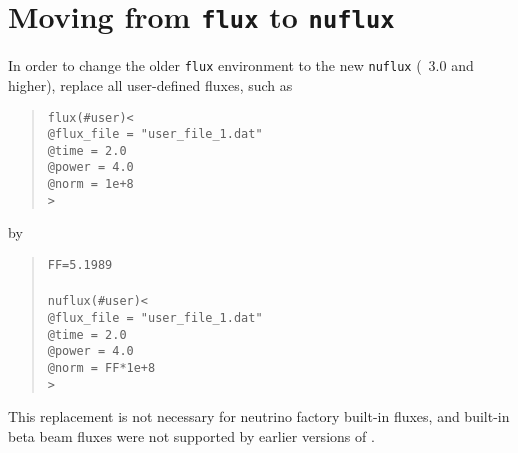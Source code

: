 \section*{Moving from {\tt flux} to {\tt nuflux}}

In order to change the older {\tt flux} environment to the
new {\tt nuflux} (\GLOBES\ 3.0 and higher), replace all user-defined fluxes, such as
\begin{quote}
{\tt flux(\#user)<}\\
{\tt \tb @flux\_file = "user\_file\_1.dat"\\
\tb @time = 2.0\\
\tb @power = 4.0\\
\tb @norm = 1e+8}\\
{\tt >}
\end{quote}
by
\begin{quote}
{\tt FF=5.1989} \\
\\
{\tt nuflux(\#user)<}\\
{\tt \tb @flux\_file = "user\_file\_1.dat"\\
\tb @time = 2.0\\
\tb @power = 4.0\\
\tb @norm = FF*1e+8}\\
{\tt >}
\end{quote}

This replacement is not necessary for neutrino factory built-in fluxes,
and built-in beta beam fluxes were not supported by earlier versions
of \GLOBES .




{\footnotesize



}



